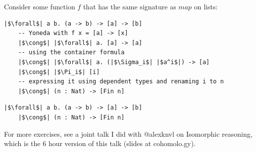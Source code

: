 \documentclass[tikz]{beamer}
\theoremstyle{definition}
\begin{document}
\begin{frame}[fragile]
Consider some function $f$ that has the same signature as $map$ on lists:
\begin{verbatim}
|$\forall$| a b. (a -> b) -> [a] -> [b]
    -- Yoneda with f x = [a] -> [x]
    |$\cong$| |$\forall$| a. [a] -> [a]
    -- using the container formula
    |$\cong$| |$\forall$| a. (|$\Sigma_i$| |$a^i$|) -> [a]
    |$\cong$| |$\Pi_i$| [i]
    -- expressing it using dependent types and renaming i to n
    |$\cong$| (n : Nat) -> [Fin n]
\end{verbatim}
\end{frame}

\begin{frame}[fragile]
\begin{verbatim}
|$\forall$| a b. (a -> b) -> [a] -> [b]
    |$\cong$| (n : Nat) -> [Fin n]
\end{verbatim}
\end{frame}


\frame
{
	For more exercises, see a joint talk I did with @alexknvl on Isomorphic reasoning, which is the 6 hour version of this talk (slides at cohomolo.gy). 
}
\end{document}
